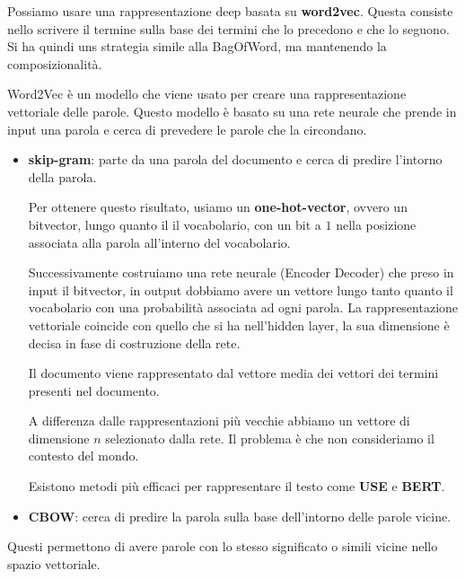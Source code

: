 Possiamo usare una rappresentazione deep basata su \textbf{word2vec}. Questa consiste
nello scrivere il termine sulla base dei termini che lo precedono e che lo seguono.
Si ha quindi uns strategia simile alla BagOfWord, ma mantenendo la composizionalità.

Word2Vec è un modello che viene usato per creare una rappresentazione vettoriale
delle parole. Questo modello è basato su una rete neurale che prende in input
una parola e cerca di prevedere le parole che la circondano.
\begin{itemize}
      \item \textbf{skip-gram}: parte da una parola del documento e cerca di
            predire l'intorno della parola.

            Per ottenere questo risultato, usiamo un \textbf{one-hot-vector},
            ovvero un bitvector, lungo quanto il il vocabolario, con un bit a $1$
            nella posizione associata alla parola all'interno del vocabolario.

            Successivamente costruiamo una rete neurale (Encoder Decoder) che
            preso in input il bitvector, in output dobbiamo avere un vettore
            lungo tanto quanto il vocabolario con una probabilità associata ad
            ogni parola. La rappresentazione vettoriale coincide con  quello che
            si ha nell'hidden layer, la sua dimensione è decisa in fase di
            costruzione della rete.

            Il documento viene rappresentato dal vettore media dei vettori dei
            termini presenti nel documento.

            A differenza dalle rappresentazioni più vecchie abbiamo un vettore di
            dimensione $n$ selezionato dalla rete. Il problema è che non consideriamo
            il contesto del mondo.

            Esistono metodi più efficaci per rappresentare il testo come
            \textbf{USE} e \textbf{BERT}.
      \item \textbf{CBOW}: cerca di predire la parola sulla base dell'intorno
            delle parole vicine.
\end{itemize}
Questi permettono di avere parole con lo stesso significato o simili vicine nello
spazio vettoriale.

